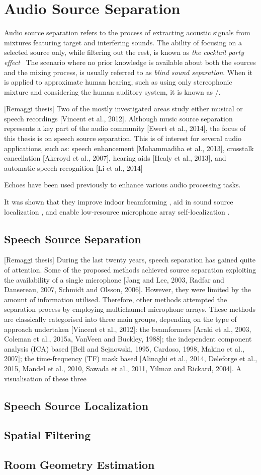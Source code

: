 \section{Audio Source Separation}
Audio source separation refers to the process of extracting acoustic signals from mixtures featuring target and interfering sounds.
The ability of focusing on a selected source only, while filtering out the rest, is known as \textit{the cocktail party effect}~
The scenario where no prior knowledge is available about both the sources and the mixing process, is usually referred to as \textit{blind sound separation}.
When it is applied to approximate human hearing, such as using only stereophonic mixture and considering the human auditory system, it is known as \CASAdef/.

[Remaggi thesis]
Two of the mostly investigated areas study either musical or speech recordings [Vincent et al., 2012].
Although music source separation represents a key part of the audio community [Ewert et al., 2014], the focus of this thesis is on speech source separation.
This is of interest for several audio applications, such as: speech enhancement [Mohammadiha et al., 2013], crosstalk cancellation [Akeroyd et al., 2007], hearing aids [Healy et al., 2013], and automatic speech recognition [Li et al., 2014]

Echoes have been used previously to enhance various audio processing tasks.

It was shown that they improve indoor beamforming ,
aid in sound source localization ,
and enable low-resource microphone array self-localization .

\subsection{Speech Source Separation}
[Remaggi thesis]
During the last twenty years, speech separation has gained quite of attention. Some of the proposed methods achieved source separation exploiting the availability of a single microphone [Jang and Lee, 2003, Radfar and Dansereau, 2007, Schmidt and Olsson, 2006]. However, they were limited by the amount of information utilised. Therefore, other methods attempted the separation process by employing multichannel microphone arrays. These methods are classically categorised into three main groups, depending on the type of approach undertaken [Vincent et al., 2012]: the beamformers [Araki et al., 2003, Coleman et al., 2015a, VanVeen and Buckley, 1988]; the independent component analysis (ICA) based [Bell and Sejnowski, 1995, Cardoso, 1998, Makino et al., 2007]; the time-frequency (TF) mask based [Alinaghi et al., 2014, Deleforge et al., 2015, Mandel et al., 2010, Sawada et al., 2011, Yilmaz and Rickard, 2004]. A visualisation of these three

\subsection{Speech Source Localization}
\subsection{Spatial Filtering}
\subsection{Room Geometry Estimation}